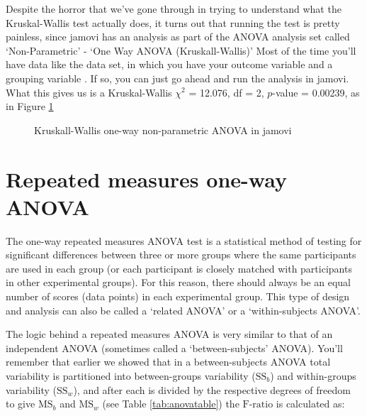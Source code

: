 
Despite the horror that we've gone through in trying to understand what the Kruskal-Wallis test actually does, it turns out that running the test is pretty painless, since jamovi has an analysis as part of the ANOVA analysis set called `Non-Parametric' - `One Way ANOVA (Kruskall-Wallis)' Most of the time you'll have data like the  data set, in which you have your outcome variable  and a grouping variable . If so, you can just go ahead and run the analysis in jamovi. What this gives us is a Kruskal-Wallis $\chi^2$ = 12.076, df = 2, $p$-value = 0.00239, as in Figure \ref{fig:anova6}

\vspace{0.5cm}
\begin{figure}[!ht]
\begin{center}
\caption{Kruskall-Wallis one-way non-parametric ANOVA in jamovi}
\HR
\label{fig:anova6}
\end{center}
\end{figure}

\newpage
\section{Repeated measures one-way ANOVA~\label{sec:RManova}}

The one-way repeated measures ANOVA test is a statistical method of testing for significant differences between three or more groups where the same participants are used in each group (or each participant is closely matched with participants in other experimental groups). For this reason, there should always be an equal number of scores (data points) in each experimental group. This type of design and analysis can also be called a `related ANOVA' or a `within-subjects ANOVA'. 

The logic behind a repeated measures ANOVA is very similar to that of an independent ANOVA (sometimes called a `between-subjects' ANOVA). You'll remember that earlier we showed that in a between-subjects ANOVA total variability is partitioned into between-groups variability ($\mbox{SS}_b$) and within-groups variability ($\mbox{SS}_w$), and after each is divided by the respective degrees of freedom to give $\mbox{MS}_b$ and $\mbox{MS}_w$ (see Table \ref{tab:anovatable}) the $\mbox{F-ratio}$ is calculated as:

